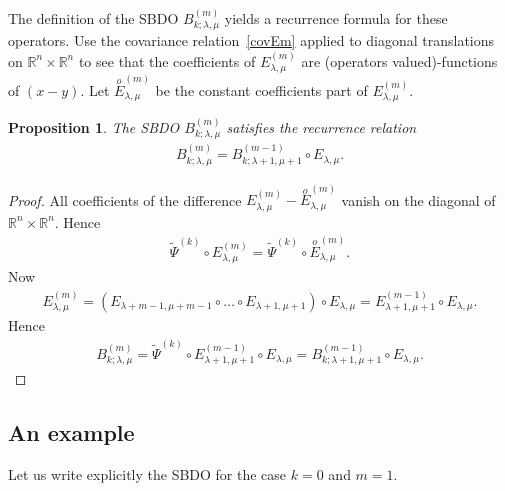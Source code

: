 \documentclass[pdftex]{sigma}
\numberwithin{equation}{section}
\newtheorem{prop}[theor]{Proposition}
\begin{document}
The definition of the SBDO $B_{k;\lambda, \mu}^{(m)}$ yields a recurrence formula for these operators. Use the covariance relation~\eqref{covEm} applied to diagonal translations on $\mathbb R^n\times \mathbb R^n$ to see that the coefficients of $E_{\lambda,\mu}^{(m)}$ are (operators valued)-functions of $(x-y)$. Let $\overset{o}{E}^{(m)}_{\lambda,\mu}$ be the constant coefficients part of $E_{\lambda,\mu}^{(m)}$.

\begin{prop} The SBDO $B_{k;\lambda,\mu}^{(m)}$ satisfies the recurrence relation
\begin{gather*}
B_{k;\lambda,\mu}^{(m)} = B_{k;\lambda+1,\mu+1}^{(m-1)}\circ E_{\lambda,\mu} .
\end{gather*}
\end{prop}

\begin{proof}

All coefficients of the difference $E_{\lambda,\mu}^{(m)}-\overset{o}{E}^{(m)}_{\lambda,\mu}$ vanish on the diagonal of $\mathbb R^n\times \mathbb R^n$. Hence
\begin{gather*}
\widetilde \Psi^{(k)} \circ E_{\lambda,\mu}^{(m)} = \widetilde \Psi^{(k)} \circ \overset{o}{E}_{\lambda,\mu}^{(m)}.
\end{gather*}
Now
\begin{gather*}
E_{\lambda,\mu}^{(m)} = \left(E_{\lambda+m-1, \mu+m-1}\circ \dots \circ E_{\lambda+1,\mu+1} \right)\circ E_{\lambda,\mu}
= E_{\lambda+1,\mu+1}^{(m-1)} \circ E_{\lambda, \mu}.
\end{gather*}
Hence
\begin{gather*}
B_{k;\lambda, \mu}^{(m)} = \widetilde \Psi^{(k)} \circ E_{\lambda+1, \mu+1}^{(m-1)}\circ E_{\lambda,\mu} = B_{k;\lambda+1,\mu+1}^{(m-1)}\circ E_{\lambda,\mu}.\tag*{\qed}
\end{gather*}
\renewcommand{\qed}{}
\end{proof}

\subsection{An example}

Let us write explicitly the SBDO for the case $k=0$ and $m=1$.
\end{document}
